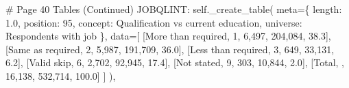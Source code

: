 \documentclass[
  11pt,
  a4paper,
]{article}
\newenvironment{Shaded}{\begin{snugshade}}{\end{snugshade}}
\newcommand{\CommentTok}[1]{\textcolor[rgb]{0.37,0.37,0.37}{#1}}
\newcommand{\NormalTok}[1]{\textcolor[rgb]{0.00,0.23,0.31}{#1}}
\newcommand{\OperatorTok}[1]{\textcolor[rgb]{0.37,0.37,0.37}{#1}}
\newcommand{\StringTok}[1]{\textcolor[rgb]{0.13,0.47,0.30}{#1}}
\newcommand{\VariableTok}[1]{\textcolor[rgb]{0.07,0.07,0.07}{#1}}
\begin{document}
\begin{Shaded}
\begin{Highlighting}[]
    \CommentTok{\# Page 40 Tables (Continued)}
    \StringTok{\textquotesingle{}JOBQLINT\textquotesingle{}}\NormalTok{: }\VariableTok{self}\NormalTok{.\_create\_table(}
\NormalTok{        meta}\OperatorTok{=}\NormalTok{\{}
            \StringTok{\textquotesingle{}length\textquotesingle{}}\NormalTok{: }\StringTok{\textquotesingle{}1.0\textquotesingle{}}\NormalTok{, }\StringTok{\textquotesingle{}position\textquotesingle{}}\NormalTok{: }\StringTok{\textquotesingle{}95\textquotesingle{}}\NormalTok{,}
            \StringTok{\textquotesingle{}concept\textquotesingle{}}\NormalTok{: }\StringTok{\textquotesingle{}Qualification vs current education\textquotesingle{}}\NormalTok{,}
            \StringTok{\textquotesingle{}universe\textquotesingle{}}\NormalTok{: }\StringTok{\textquotesingle{}Respondents with job\textquotesingle{}}
\NormalTok{        \},}
\NormalTok{        data}\OperatorTok{=}\NormalTok{[}
\NormalTok{            [}\StringTok{\textquotesingle{}More than required\textquotesingle{}}\NormalTok{, }\StringTok{\textquotesingle{}1\textquotesingle{}}\NormalTok{, }\StringTok{\textquotesingle{}6,497\textquotesingle{}}\NormalTok{, }\StringTok{\textquotesingle{}204,084\textquotesingle{}}\NormalTok{, }\StringTok{\textquotesingle{}38.3\textquotesingle{}}\NormalTok{],}
\NormalTok{            [}\StringTok{\textquotesingle{}Same as required\textquotesingle{}}\NormalTok{, }\StringTok{\textquotesingle{}2\textquotesingle{}}\NormalTok{, }\StringTok{\textquotesingle{}5,987\textquotesingle{}}\NormalTok{, }\StringTok{\textquotesingle{}191,709\textquotesingle{}}\NormalTok{, }\StringTok{\textquotesingle{}36.0\textquotesingle{}}\NormalTok{],}
\NormalTok{            [}\StringTok{\textquotesingle{}Less than required\textquotesingle{}}\NormalTok{, }\StringTok{\textquotesingle{}3\textquotesingle{}}\NormalTok{, }\StringTok{\textquotesingle{}649\textquotesingle{}}\NormalTok{, }\StringTok{\textquotesingle{}33,131\textquotesingle{}}\NormalTok{, }\StringTok{\textquotesingle{}6.2\textquotesingle{}}\NormalTok{],}
\NormalTok{            [}\StringTok{\textquotesingle{}Valid skip\textquotesingle{}}\NormalTok{, }\StringTok{\textquotesingle{}6\textquotesingle{}}\NormalTok{, }\StringTok{\textquotesingle{}2,702\textquotesingle{}}\NormalTok{, }\StringTok{\textquotesingle{}92,945\textquotesingle{}}\NormalTok{, }\StringTok{\textquotesingle{}17.4\textquotesingle{}}\NormalTok{],}
\NormalTok{            [}\StringTok{\textquotesingle{}Not stated\textquotesingle{}}\NormalTok{, }\StringTok{\textquotesingle{}9\textquotesingle{}}\NormalTok{, }\StringTok{\textquotesingle{}303\textquotesingle{}}\NormalTok{, }\StringTok{\textquotesingle{}10,844\textquotesingle{}}\NormalTok{, }\StringTok{\textquotesingle{}2.0\textquotesingle{}}\NormalTok{],}
\NormalTok{            [}\StringTok{\textquotesingle{}Total\textquotesingle{}}\NormalTok{, }\StringTok{\textquotesingle{}\textquotesingle{}}\NormalTok{, }\StringTok{\textquotesingle{}16,138\textquotesingle{}}\NormalTok{, }\StringTok{\textquotesingle{}532,714\textquotesingle{}}\NormalTok{, }\StringTok{\textquotesingle{}100.0\textquotesingle{}}\NormalTok{]}
\NormalTok{        ]}
\NormalTok{    ),}


\end{Highlighting}
\end{Shaded}
\end{document}
